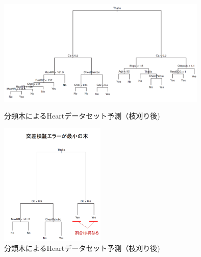 \documentclass[uplatex]{jsarticle}
\begin{document}
\begin{figure}[htbp]
\begin{minipage}{0.7\hsize}
 \begin{center}
  \includegraphics[width=100mm]{img/class_orig.png}
 \end{center}
 \caption{分類木によるHeartデータセット予測（枝刈り後)}
 \label{fig:one}
\end{minipage}
\begin{minipage}{0.3\hsize}
 \begin{center}
  \includegraphics[width=50mm]{img/class_tree.png}
 \end{center}
 \caption{分類木によるHeartデータセット予測（枝刈り後)}
 \label{fig:two}
\end{minipage}
\end{figure}
\end{document}
